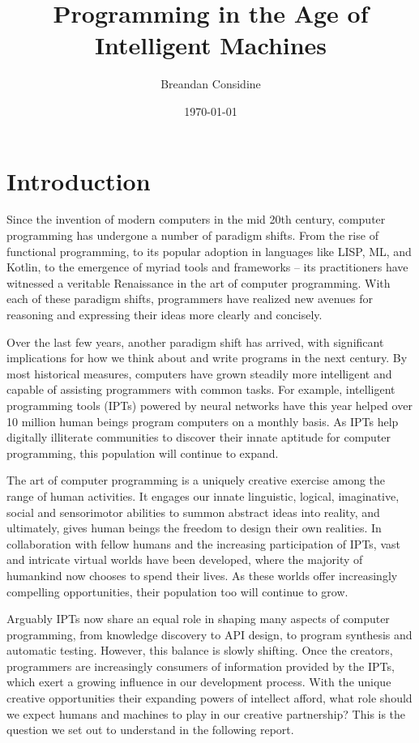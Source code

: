 \documentclass[10pt]{article}
\title{Programming in the Age of Intelligent Machines}
\author{Breandan Considine}
\date{\today}
\begin{document}
  \maketitle
  \section{Introduction}

Since the invention of modern computers in the mid 20th century, computer programming has undergone a number of paradigm shifts. From the rise of functional programming, to its popular adoption in languages like LISP, ML, and Kotlin, to the emergence of myriad tools and frameworks -- its practitioners have witnessed a veritable Renaissance in the art of computer programming. With each of these paradigm shifts, programmers have realized new avenues for reasoning and expressing their ideas more clearly and concisely.

Over the last few years, another paradigm shift has arrived, with significant implications for how we think about and write programs in the next century. By most historical measures, computers have grown steadily more intelligent and capable of assisting programmers with common tasks. For example, intelligent programming tools (IPTs) powered by neural networks have this year helped over 10 million human beings program computers on a monthly basis. As IPTs help digitally illiterate communities to discover their innate aptitude for computer programming, this population will continue to expand.

The art of computer programming is a uniquely creative exercise among the range of human activities. It engages our innate linguistic, logical, imaginative, social  and sensorimotor abilities to summon abstract ideas into reality, and ultimately, gives human beings the freedom to design their own realities. In collaboration with fellow humans and the increasing participation of IPTs, vast and intricate virtual worlds have been developed, where the majority of humankind now chooses to spend their lives. As these worlds offer increasingly compelling opportunities, their population too will continue to grow.

Arguably IPTs now share an equal role in shaping many aspects of computer programming, from knowledge discovery to API design, to program synthesis and automatic testing. However, this balance is slowly shifting. Once the creators, programmers are increasingly consumers of information provided by the IPTs, which exert a growing influence in our development process. With the unique creative opportunities their expanding powers of intellect afford, what role should we expect humans and machines to play in our creative partnership? This is the question we set out to understand in the following report.
\end{document}
